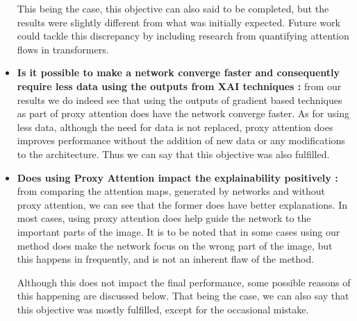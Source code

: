 \begin{itemize}
This being the case, this objective can also said to be completed, but the results were slightly different from what was initially expected. Future work could tackle this discrepancy by including research from quantifying attention flows in transformers. \cite{abnarQuantifyingAttentionFlow2020}
\item \textbf{Is it possible to make a network converge faster and consequently require less data using the outputs from XAI techniques :} from our results we do indeed see that using the outputs of gradient based techniques as part of proxy attention does have the network converge faster. As for using less data, although the need for data is not replaced, proxy attention does improves performance without the addition of new data or any modifications to the architecture. Thus we can say that this objective was also fulfilled.
\item \textbf{Does using Proxy Attention impact the explainability positively :} from comparing the attention maps, generated by networks and without proxy attention, we can see that the former does have better explanations. In most cases, using proxy attention does help guide the network to the important parts of the image. It is to be noted that in some cases using our method does make the network focus on the wrong part of the image, but this happens in frequently, and is not an inherent flaw of the method.

Although this does not impact the final performance, some possible reasons of this happening are discussed below. That being the case, we can also say that this objective was mostly fulfilled, except for the occasional mistake.
\end{itemize}


